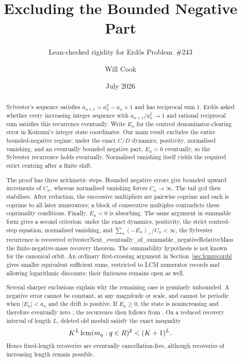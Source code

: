 \documentclass[11pt]{article}
\title{Excluding the Bounded Negative Part}
\subtitle{Lean-checked rigidity for Erd\H{o}s Problem~\#243}
\author{Will Cook}
\date{July 2026}
\begin{document}
\maketitle
\noteprovenance

\begin{abstract}
\noindent
Sylvester's sequence satisfies $a_{n+1}=a_n^2-a_n+1$ and has reciprocal sum
$1$.  Erd\H{o}s asked whether every increasing integer sequence with
$a_{n+1}/a_n^2\to1$ and rational reciprocal sum satisfies this recurrence
eventually.  Write $E_n$ for the centred denominator-clearing error in
Koizumi's integer state coordinates.  Our main result excludes the entire
bounded-negative regime: under the exact $C/D$ dynamics, positivity,
normalised vanishing, and an eventually bounded negative part, $E_n=0$
eventually, so the Sylvester recurrence holds eventually.  Normalised
vanishing itself yields the required strict centring after a finite shift.

The proof has three arithmetic steps.  Bounded negative errors give bounded
upward increments of $C_n$, whereas normalised vanishing forces $C_n\to\infty$.
The tail gcd then stabilises.  After reduction, the successive multipliers are
pairwise coprime and each is coprime to all later numerators; a block of
consecutive multiples contradicts these coprimality conditions.  Finally,
$E_n=0$ is absorbing.  The same argument in summable form gives a second
criterion: under the exact dynamics, positivity, the strict centred-step
equation, normalised vanishing, and
$\sum_n(-E_n)_+/C_n<\infty$, the Sylvester recurrence is recovered
      {sylvesterNext_eventually_of_summable_negativeRelativeMass}
      {the finite-negative-mass recovery theorem}.
The summability hypothesis is not known for the canonical orbit.
An ordinary first-crossing argument in Section~\ref{sec:lcmrecords} gives
smaller equivalent sufficient sums, restricted to LCM numerator records and
allowing logarithmic discounts; their finiteness remains open as well.

Several sharper exclusions explain why the remaining case is genuinely
unbounded.  A negative error cannot be constant, at any magnitude or scale, and
cannot be periodic when $|E_n|<a_n$ and the drift is positive.  If $E_n\ge0$,
the state is nonincreasing and therefore eventually zero
;
the recurrence then follows from
.
On a reduced recovery interval of length $L$, deleted old moduli satisfy the
exact inequality
\[
 K^L\operatorname{lcm}(m_q:q\in R)^2<(K+1)^L.
\]
Hence fixed-length recoveries are eventually cancellation-free, although
recoveries of increasing length remain possible.


\end{abstract}
\end{document}
